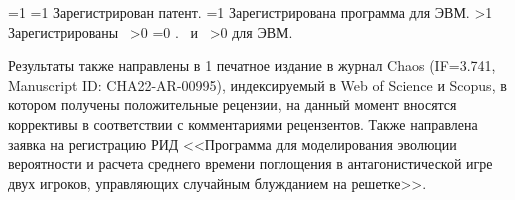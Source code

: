 {\begin{refsection}
        \ifnum \value{citeregistered}=1%
            \ifnum \value{citeauthorpatent}=1%
                Зарегистрирован  патент.
            \fi%
            \ifnum \value{citeauthorprogram}=1%
                Зарегистрирована  программа для ЭВМ.
            \fi%
        \fi%
        \ifnum \value{citeregistered}>1%
            Зарегистрированы\ %
            \ifnum \value{citeauthorpatent}>0%
            \sloppy%
            \ifnum \value{citeauthorprogram}=0 . \else \ и~\fi%
            \fi%
            \ifnum \value{citeauthorprogram}>0%
             для ЭВМ.
            \fi%
        \fi%
    \end{refsection}%
    \begin{refsection}
        \nocite{bib1}%
        \nocite{bib2}%
        \nocite{confbib1}%
    \end{refsection}%
}

Результаты также направлены в 1 печатное издание в журнал Chaos (IF=3.741, Manuscript ID: CHA22-AR-00995), индексируемый
в Web of Science и Scopus, в котором получены положительные
рецензии, на данный момент вносятся коррективы в соответствии
с комментариями рецензентов. Также направлена заявка на регистрацию РИД
<<Программа для моделирования эволюции вероятности и 
расчета среднего времени поглощения в антагонистической игре двух игроков, управляющих 
случайным блужданием на решетке>>.

